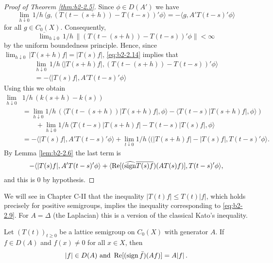 \begin{proof}[Proof of Theorem \ref{thm:b2-2.5}]
Since $\phi \in D(A')$ we have
\begin{equation}\label{eq:b2-2.14}
\lim_{h \downarrow 0}\, 1/h\, \langle g,(T(t-(s+h)) - T(t-s))'\phi \rangle = - \langle g,A'T(t-s)'\phi \rangle
\end{equation}
for all $g \in C_{0}(X)$.
Consequently,
\begin{equation*}
\overline{\lim}_{h \downarrow 0}\, 1/h\, \|(T(t-(s+h)) - T(t-s))'\phi\| < \infty
\end{equation*}
by the uniform boundedness principle.
Hence, since $\lim_{h \downarrow 0}\, |T(s+h)f| = |T(s)f|$, \eqref{eq:b2-2.14} implies that
\begin{equation}\label{eq:b2-2.15}
\begin{split}
\lim_{h \downarrow 0}\, 1/h\, \langle |T(s+h)f|,(T(t-(s+h)) - T(t-s))'\phi \rangle \\
= - \langle |T(s)f|,A'T(t-s)'\phi \rangle
\end{split}
\end{equation}
Using this we obtain
\begin{align*}
\lim_{h \downarrow 0} &1/h\, (k(s+h) - k(s)) \\
&= \lim_{h \downarrow 0} 1/h\, (\langle T(t-(s+h))|T(s+h)f|,\phi \rangle - \langle T(t-s)|T(s+h)f|,\phi \rangle) \\
&\qquad + \lim_{h \downarrow 0} 1/h\, \langle T(t-s)|T(s+h)f| - T(t-s)|T(s)f|,\phi \rangle \\
&= -\langle |T(s)f|,A'T(t-s)'\phi \rangle + \lim_{t \downarrow 0} 1/h \, \langle (|T(s+h)f| -  |T(s)f| , T(t-s)'\phi \rangle .
\end{align*}
By Lemma \ref{lem:b2-2.6} the last term is
\begin{align*}
- \langle |T(s)f|,A'T(t-s)'\phi \rangle + \langle \mathop{}\!\mathrm{Re}[(\widehat{\operatorname{sign}} \overline{T(s)f})(AT(s)f)],T(t-s)'\phi \rangle,
\end{align*}
and this is $0$ by hypothesis.
\end{proof}

\begin{remark}\label{rem:b2-2.7}
We will see in Chapter C-II that the inequality $|T(t)f| \leq T(t)|f|$, which holds precisely for positive semigroups, implies the inequality corresponding to \eqref{eq:b2-2.9}.
For $A = \Delta$ (the Laplacian) this is a version of the classical Kato's inequality.
\end{remark}
\begin{corollary}\label{cor:b2-2.8}
Let $(T(t))_{t \geq 0}$ be a lattice semigroup on $C_{0}(X)$ with generator $A$.
If $f \in D(A)$ and $f(x) \neq 0$ for all $x \in X$, then 
\[
|f| \in D(A) \text{ and } \mathop{}\!\mathrm{Re}[(\operatorname{sign} \bar{f})(Af)] = A|f|\,.
\]
\end{corollary}

